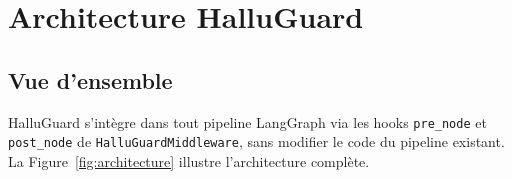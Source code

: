 \documentclass[12pt,a4paper]{article}
\begin{document}
\section{Architecture HalluGuard}

\subsection{Vue d'ensemble}

HalluGuard s'intègre dans tout pipeline LangGraph via les hooks \texttt{pre\_node} et \texttt{post\_node} de \texttt{HalluGuardMiddleware}, sans modifier le code du pipeline existant. La Figure~\ref{fig:architecture} illustre l'architecture complète.
\end{document}
